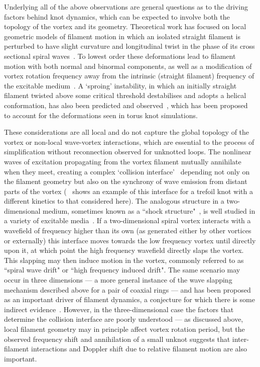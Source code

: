Underlying all of the above observations are general questions as to the driving factors behind knot dynamics, which can be expected to involve both the topology of the vortex and its geometry. 
Theoretical work has focused on local geometric models of filament motion in which an isolated straight filament is perturbed to have slight curvature and longitudinal twist in the phase of its cross sectional spiral waves~\citep{Keener1988,Keener1992,Henry2002,Biktashev1994,Echebarria2006,Dierckx2010}. To lowest order these deformations lead to filament motion with both normal and binormal components, as well as a modification of vortex rotation frequency away from the intrinsic (straight filament) frequency of the excitable medium~\citep{Keener1988,Biktashev1994,Dierckx2010}. A `sproing' instability, in which an initially straight filament twisted above some critical threshold destabilises and adopts a helical conformation, has also been predicted and observed~\citep{Keener1988,Henze1993,Henry2002,Echebarria2006, Dierckx2010}, which has been proposed~\citep{Maucher2017} to account for the deformations seen in torus knot simulations. 

These considerations are all local and do not capture the global topology of the vortex or non-local wave-vortex interactions, which are essential to the process of simplification without reconnection observed for unknotted loops. The nonlinear waves of excitation propagating from the vortex filament mutually annihilate when they meet, creating a complex `collision interface'~\citep{Winfree1990, Henze1991, Henze1993, WinfreeChapter, Sutcliffe2003} depending not only on the filament geometry but also on the synchrony of wave emission from distant parts of the vortex (~\citep{Henze1991} shows an example of this interface for a trefoil knot with a different kinetics to that considered here). The analogous structure in a two-dimensional medium, sometimes known as a ``shock structure"~\citep{Kopell1973}, is well studied in a variety of excitable media~\citep{Krinsky1983,Ermakova1986,Vinson1998,Gottwald2001,Agladze2007,Steinbock2011}. If a two-dimensional spiral vortex interacts with a wavefield of frequency higher than its own (as generated either by other vortices or externally) this interface moves towards the low frequency vortex until directly upon it, at which point the high frequency wavefield directly slaps the vortex. This slapping may then induce motion in the vortex, commonly referred to as ``spiral wave drift" or ``high frequency induced drift". The same scenario may occur in three dimensions --- a more general instance of the wave slapping mechanism described above for a pair of coaxial rings --- and has been proposed as an important driver of filament dynamics, a conjecture for which there is some indirect evidence~\citep{WinfreeChapter, Sutcliffe2003,Maucher2019}. However, in the three-dimensional case the factors that determine the collision interface are poorly understood --- as discussed above, local filament geometry may in principle affect vortex rotation period, but the observed frequency shift and annihilation of a small unknot suggests that inter-filament interactions and Doppler shift due to relative filament motion are also important.

